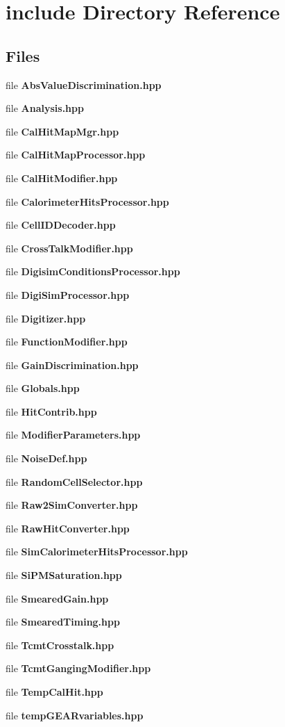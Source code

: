 \section{include Directory Reference}
\label{dir_65d42f7035c01375e5077d660484c669}
\subsection*{Files}
\begin{DoxyCompactItemize}
\item 
file {\bfseries Abs\-Value\-Discrimination.\-hpp}
\item 
file {\bfseries Analysis.\-hpp}
\item 
file {\bfseries Cal\-Hit\-Map\-Mgr.\-hpp}
\item 
file {\bfseries Cal\-Hit\-Map\-Processor.\-hpp}
\item 
file {\bfseries Cal\-Hit\-Modifier.\-hpp}
\item 
file {\bfseries Calorimeter\-Hits\-Processor.\-hpp}
\item 
file {\bfseries Cell\-I\-D\-Decoder.\-hpp}
\item 
file {\bfseries Cross\-Talk\-Modifier.\-hpp}
\item 
file {\bfseries Digisim\-Conditions\-Processor.\-hpp}
\item 
file {\bfseries Digi\-Sim\-Processor.\-hpp}
\item 
file {\bfseries Digitizer.\-hpp}
\item 
file {\bfseries Function\-Modifier.\-hpp}
\item 
file {\bfseries Gain\-Discrimination.\-hpp}
\item 
file {\bfseries Globals.\-hpp}
\item 
file {\bfseries Hit\-Contrib.\-hpp}
\item 
file {\bfseries Modifier\-Parameters.\-hpp}
\item 
file {\bfseries Noise\-Def.\-hpp}
\item 
file {\bfseries Random\-Cell\-Selector.\-hpp}
\item 
file {\bfseries Raw2\-Sim\-Converter.\-hpp}
\item 
file {\bfseries Raw\-Hit\-Converter.\-hpp}
\item 
file {\bfseries Sim\-Calorimeter\-Hits\-Processor.\-hpp}
\item 
file {\bfseries Si\-P\-M\-Saturation.\-hpp}
\item 
file {\bfseries Smeared\-Gain.\-hpp}
\item 
file {\bfseries Smeared\-Timing.\-hpp}
\item 
file {\bfseries Tcmt\-Crosstalk.\-hpp}
\item 
file {\bfseries Tcmt\-Ganging\-Modifier.\-hpp}
\item 
file {\bfseries Temp\-Cal\-Hit.\-hpp}
\item 
file {\bfseries temp\-G\-E\-A\-Rvariables.\-hpp}
\end{DoxyCompactItemize}
